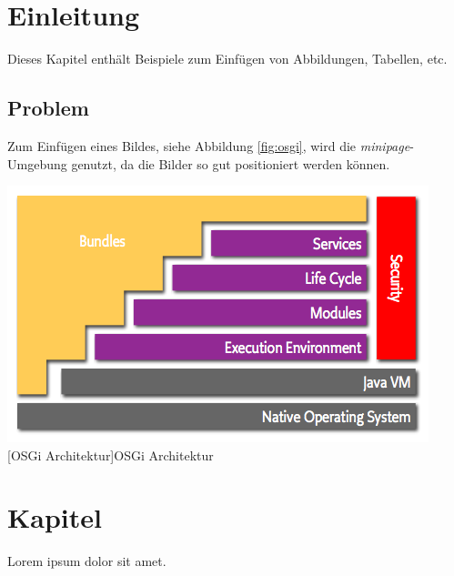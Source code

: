 \documentclass[12pt,a4paper,bibliography=totocnumbered,listof=totocnumbered]{scrartcl}
\begin{document}
\onehalfspacing
\renewcommand{\thesection}{\arabic{section}}
\renewcommand{\theHsection}{\arabic{section}}
\setcounter{section}{0}
\setcounter{page}{1}

\section{Einleitung}
Dieses Kapitel enthält Beispiele zum Einfügen von Abbildungen, Tabellen, etc.

\subsection{Problem}
Zum Einfügen eines Bildes, siehe Abbildung \ref{fig:osgi}, wird die \textit{minipage}-Umgebung genutzt, da die Bilder so gut positioniert werden können.

\vspace{1em}
\begin{minipage}{\linewidth}
	\centering
	\includegraphics[width=0.7\linewidth]{images/layering-osgi.png}
	[OSGi Architektur]{OSGi Architektur\footnotemark }
	\label{fig:osgi}
\end{minipage}

\section{Kapitel}
Lorem ipsum dolor sit amet.
\end{document}
